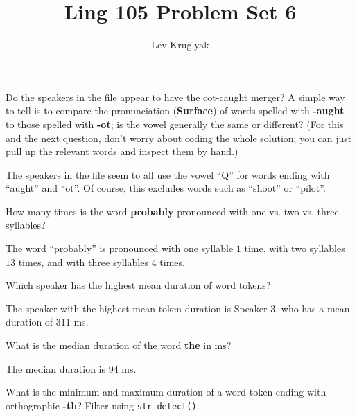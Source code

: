 \documentclass{../../templates/lkx_pset}
\title{Ling 105 Problem Set 6}
\author{Lev Kruglyak}
\begin{document}
\maketitle
\begin{problem}{1}
Do the speakers in the file appear to have the cot-caught merger? A simple way to tell is to compare the pronunciation (\textbf{Surface}) of words spelled with \textbf{-aught} to those spelled with \textbf{-ot}; is the vowel generally the same or different? (For this and the next question, don't worry about coding the whole solution; you can just pull up the relevant words and inspect them by hand.)
\end{problem}

\begin{solution}
	The speakers in the file seem to all use the vowel ``Q'' for words ending with ``aught'' and ``ot''. Of course, this excludes words such as ``shoot'' or ``pilot''.
\end{solution}

\begin{problem}{2}
How many times is the word \textbf{probably} pronounced with one vs. two vs. three syllables?
\end{problem}

\begin{solution}
	The word ``probably'' is pronounced with one syllable $1$ time, with two syllables $13$ times, and with three syllables $4$ times.
\end{solution}

\begin{problem}{3}
Which speaker has the highest mean duration of word tokens?
\end{problem}

\begin{solution}
	The speaker with the highest mean token duration is Speaker 3, who has a mean duration of 311 ms.
\end{solution}

\begin{problem}{4}
What is the median duration of the word \textbf{the} in ms?
\end{problem}

\begin{solution}
	The median duration is 94 ms.
\end{solution}

\begin{problem}{5}
What is the minimum and maximum duration of a word token ending with orthographic \textbf{-th}? Filter using \texttt{str\_detect()}.
\end{problem}
\end{document}
